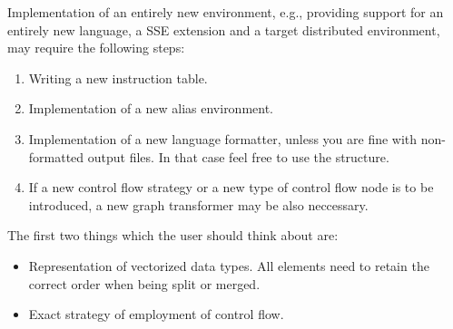Implementation of an entirely new environment, e.g., providing support for an entirely new language, a SSE extension and a target distributed environment, may require the following steps:

\begin{enumerate}
  \item Writing a new instruction table.
  \item Implementation of a new alias environment. 
  \item Implementation of a new language formatter, unless you are fine with non-formatted output files. In that case feel free to use the  structure.
  \item If a new control flow strategy or a new type of control flow node is to be introduced, a new graph transformer may be also neccessary.
\end{enumerate}

The first two things which the user should think about are:

\begin{itemize}
  \item Representation of vectorized data types. All elements need to retain the correct order when being split or merged.
  \item Exact strategy of employment of control flow.
\end{itemize}






